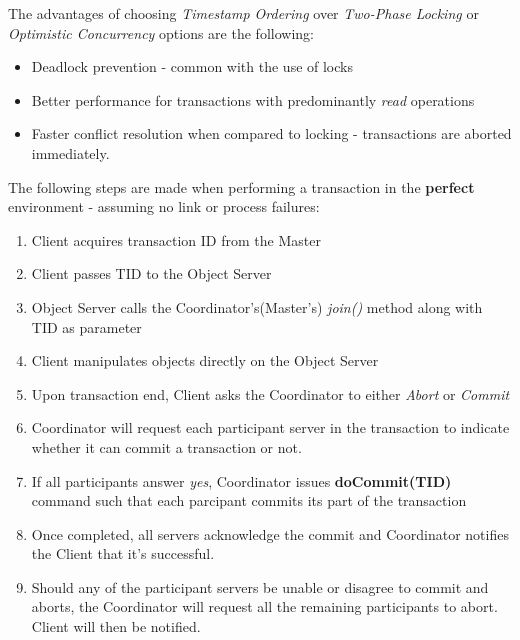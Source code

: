 \documentclass[times, 10pt,twocolumn]{article}
\begin{document}
The advantages of choosing {\it Timestamp Ordering} over {\it Two-Phase Locking} or {\it Optimistic Concurrency} options are the following: 
\begin{itemize}
\item Deadlock prevention - common with the use of locks
\item Better performance for transactions with predominantly {\it read} operations \cite{bernstein1987concurrency}
\item Faster conflict resolution when compared to locking - transactions are aborted immediately.
\end{itemize}

The following steps are made when performing a transaction in the {\bf perfect} environment - assuming no link or process failures: 
\begin{enumerate}
\item Client acquires transaction ID from the Master
\item Client passes TID to the Object Server
\item Object Server calls the Coordinator's(Master's) {\it join()} method along with TID as parameter
\item Client manipulates objects directly on the Object Server
\item Upon transaction end, Client asks the Coordinator to either {\it Abort} or {\it Commit} 
\item Coordinator will request each participant server in the transaction to indicate whether it can commit a transaction or not.
\item If all participants answer {\it yes}, Coordinator issues {\bf doCommit(TID)} command such that each parcipant commits its part of the transaction
\item Once completed, all servers acknowledge the commit and Coordinator notifies the Client that it's successful.
\item Should any of the participant servers be unable or disagree to commit and aborts, the Coordinator will request all the remaining participants to abort. Client will then be notified.
\end{enumerate}
\end{document}
